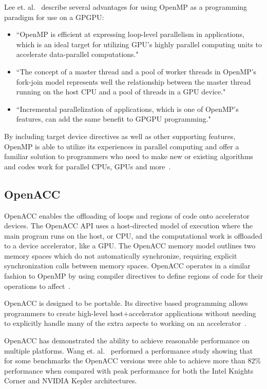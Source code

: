 Lee et. al.~\cite{lee2009openmp} describe several advantages for using OpenMP as a programming paradigm for use on a GPGPU:
\begin{itemize}
\item ``OpenMP is efficient at expressing loop-level parallelism in applications, which is an ideal target for utilizing GPU's highly parallel computing units to accelerate data-parallel computations."
\item ``The concept of a master thread and a pool of worker threads in OpenMP's fork-join model represents well the relationship between the master thread running on the host CPU and a pool of threads in a GPU device."
\item ``Incremental parallelization of applications, which is one of OpenMP's features, can add the same benefit to GPGPU programming."
\end{itemize}

By including target device directives as well as other supporting features, OpenMP is able to utilize its experiences in parallel computing and offer a familiar solution to programmers who need to make new or existing algorithms and codes work for parallel CPUs, GPUs and more~\cite{ayguade2010extending}.

\subsection*{\textbf{OpenACC}}

OpenACC enables the offloading of loops and regions of code onto accelerator devices.
%
The OpenACC API uses a host-directed model of execution where the main program runs on the host, or CPU, and the computational work is offloaded to a device accelerator, like a GPU.
%
The OpenACC memory model outlines two memory spaces which do not automatically synchronize, requiring explicit synchronization calls between memory spaces.
%
OpenACC operates in a similar fashion to OpenMP by using compiler directives to define regions of code for their operations to affect~\cite{wienke2012openacc}.

OpenACC is designed to be portable.
%
Its directive based programming allows programmers to create high-level host+accelerator applications without needing to explicitly handle many of the extra aspects to working on an accelerator~\cite{openacc}.

OpenACC has demonstrated the ability to achieve reasonable performance on multiple platforms.
%
Wang et. al.~\cite{wang2013performance} performed a performance study showing that for some benchmarks the OpenACC versions were able to achieve more than 82\% performance when compared with peak performance for both the Intel Knights Corner and NVIDIA Kepler architectures.


